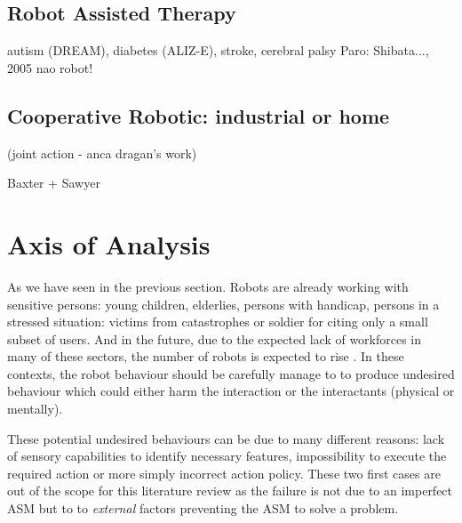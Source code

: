	\subsection{Robot Assisted Therapy}
		autism (DREAM), diabetes (ALIZ-E), stroke, cerebral palsy
		Paro: Shibata..., 2005
		nao robot!
	
	\subsection{Cooperative Robotic: industrial or home }
	(joint action - anca dragan's work)
	
	Baxter + Sawyer


\section{Axis of Analysis}

As we have seen in the previous section. Robots are already working with sensitive persons: young children, elderlies, persons with handicap, persons in a stressed situation: victims from catastrophes or soldier for citing only a small subset of users. And in the future, due to the expected lack of workforces in many of these sectors, the number of robots is expected to rise . In these contexts, the robot behaviour should be carefully manage to to produce undesired behaviour which could either harm the interaction or the interactants (physical or mentally).

These potential undesired behaviours can be due to many different reasons: lack of sensory capabilities to identify necessary features, impossibility to execute the required action or more simply incorrect action policy. These two first cases are out of the scope for this literature review as the failure is not due to an imperfect ASM but to to \emph{external} factors preventing the ASM to solve a problem. 





